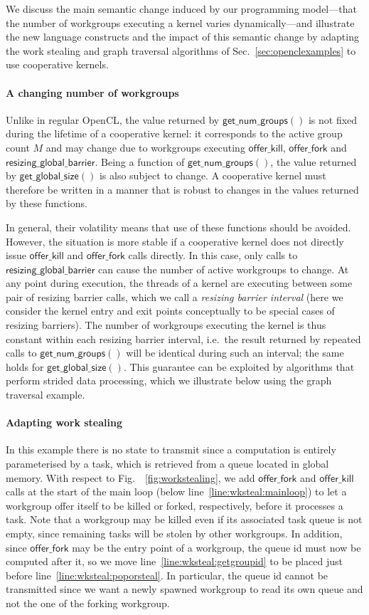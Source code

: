 \documentclass[numbers,nocopyrightspace,10pt]{sigplanconf}
\newcommand{\myfig}{Fig.~}
\newcommand{\mysec}{Sec.~}
\newcommand{\offerfork}{\mathsf{offer\_fork}}
\newcommand{\offerkill}{\mathsf{offer\_kill}}
\newcommand{\resizingglobalbarrier}{\mathsf{resizing\_global\_barrier}}
\newcommand{\getnumgroups}{\mathsf{get\_num\_groups}}
\newcommand{\getglobalsize}{\mathsf{get\_global\_size}}
\begin{document}
We discuss the main semantic change induced by our programming
model---that the number of workgroups executing a kernel varies
dynamically---and illustrate the new language constructs and the
impact of this semantic change by adapting the work stealing and graph
traversal algorithms of \mysec\ref{sec:openclexamples} to use
cooperative kernels.

\paragraph{A changing number of workgroups}  Unlike in regular OpenCL,
the value returned by $\getnumgroups()$ is not fixed during the
lifetime of a cooperative kernel: it corresponds to the active group count $M$ and may change due to workgroups executing
$\offerkill$, $\offerfork$ and $\resizingglobalbarrier$.  Being a function of $\getnumgroups()$, the value returned by $\getglobalsize()$
is also subject to change.
A cooperative kernel must therefore be written in a manner that is
robust to changes in the values returned by these functions.

In general, their volatility means that use of these functions should be avoided.
However, the situation is more stable if a cooperative kernel does not directly
issue $\offerkill$ and $\offerfork$ calls directly.  In this case,
only calls to $\resizingglobalbarrier$ can cause the number of active
workgroups to change.  At any point
during execution, the threads of a kernel are executing between some
pair of resizing barrier calls, which we call a \emph{resizing barrier
  interval} (here we consider the kernel entry and exit points
conceptually to be special cases of resizing barriers).  The number of
workgroups executing the kernel is thus constant within each resizing
barrier interval, i.e.\ the result returned by repeated calls to
$\getnumgroups()$ will be identical during such an interval; the same holds for $\getglobalsize()$.
%
This guarantee can be exploited by algorithms that perform strided
data processing, which we illustrate below using the graph traversal
example.


\paragraph{Adapting work stealing}

In this example there is no state to transmit since a computation is
entirely parameterised by a task, which is retrieved from a queue
located in global memory. With respect to \myfig~\ref{fig:workstealing},
we add $\offerfork$ and $\offerkill$ calls at the start of the main loop
(below line~\ref{line:wksteal:mainloop}) to let a workgroup offer itself
to be killed or forked, respectively, before it processes a task.  Note
that a workgroup may be killed even if its associated task queue is not
empty, since remaining tasks will be stolen by other workgroups. In
addition, since $\offerfork$ may be the entry point of a workgroup, the
queue id must now be computed after it, so we move
line~\ref{line:wksteal:getgroupid} to be placed just before
line~\ref{line:wksteal:poporsteal}. In particular, the queue id cannot
be transmitted since we want a newly spawned workgroup to read its own
queue and not the one of the forking workgroup.
\end{document}
